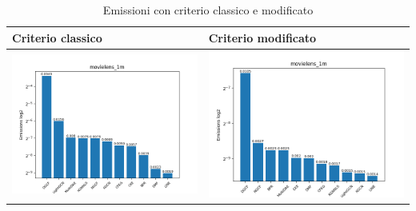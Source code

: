 \begin{table}[H]
    \centering
    \footnotesize
    \setlength\tabcolsep{0pt}
    \begin{tabularx}{\textwidth}{|X|X|}
        \hline
        \textbf{Criterio classico} & \textbf{Criterio modificato} \\
        \hline
        \includegraphics[width=\linewidth, trim=0 0 0 0]{images/emissions_movielens_1m_earlyClassic.png} &
        \includegraphics[width=\linewidth, trim=0 0 0 0]{images/emissions_movielens_1m_earlyModified.png} \\
        \hline
    \end{tabularx}
    \caption{Emissioni con criterio classico e modificato}
    \label{tab:emissions_info}
\end{table}

